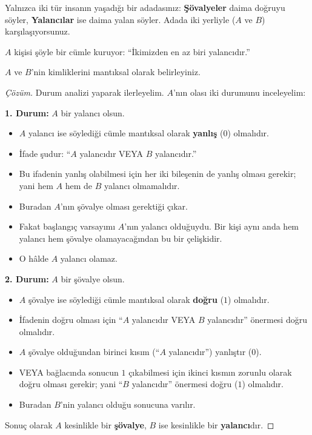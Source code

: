 \begin{example}
Yalnızca iki tür insanın yaşadığı bir adadasınız: \textbf{Şövalyeler} daima doğruyu söyler, \textbf{Yalancılar} ise daima yalan söyler. Adada iki yerliyle ($A$ ve $B$) karşılaşıyorsunuz. 

$A$ kişisi şöyle bir cümle kuruyor: ``İkimizden en az biri yalancıdır.'' 

$A$ ve $B$'nin kimliklerini mantıksal olarak belirleyiniz.
\end{example}
\begin{proof}[Çözüm]
Durum analizi yaparak ilerleyelim. $A$'nın olası iki durumunu inceleyelim:

\textbf{1. Durum:} $A$ bir yalancı olsun.
\begin{itemize}
  \item $A$ yalancı ise söylediği cümle mantıksal olarak \textbf{yanlış} ($0$) olmalıdır.
  \item İfade şudur: ``$A$ yalancıdır VEYA $B$ yalancıdır.''
  \item Bu ifadenin yanlış olabilmesi için her iki bileşenin de yanlış olması gerekir; yani hem $A$ hem de $B$ yalancı olmamalıdır.
  \item Buradan $A$'nın şövalye olması gerektiği çıkar.
  \item Fakat başlangıç varsayımı $A$'nın yalancı olduğuydu. Bir kişi aynı anda hem yalancı hem şövalye olamayacağından bu bir çelişkidir.
  \item O hâlde $A$ yalancı olamaz.
\end{itemize}

\textbf{2. Durum:} $A$ bir şövalye olsun.
\begin{itemize}
  \item $A$ şövalye ise söylediği cümle mantıksal olarak \textbf{doğru} ($1$) olmalıdır.
  \item İfadenin doğru olması için ``$A$ yalancıdır VEYA $B$ yalancıdır'' önermesi doğru olmalıdır.
  \item $A$ şövalye olduğundan birinci kısım (``$A$ yalancıdır'') yanlıştır ($0$).
  \item VEYA bağlacında sonucun $1$ çıkabilmesi için ikinci kısmın zorunlu olarak doğru olması gerekir; yani ``$B$ yalancıdır'' önermesi doğru ($1$) olmalıdır.
  \item Buradan $B$'nin yalancı olduğu sonucuna varılır.
\end{itemize}

Sonuç olarak $A$ kesinlikle bir \textbf{şövalye}, $B$ ise kesinlikle bir \textbf{yalancı}dır.
\end{proof}

